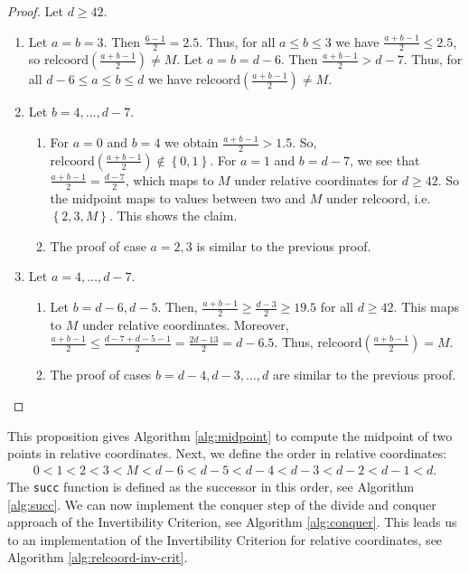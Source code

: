 \begin{proof}
    Let \( d \geq 42 \).
    \begin{enumerate}
        \item Let \( a = b = 3 \). Then \( \frac{6 - 1 }{2} = 2.5 \). Thus, for all \( a \leq b \leq 3 \) we have \( \frac{a + b - 1 }{2} \leq 2.5 \), so \(\mathrm{relcoord}( \frac{a + b - 1 }{2})  \neq M \). Let \( a = b = d - 6 \). Then \( \frac{a + b -1}{2} > d - 7 \). Thus, for all \( d-6 \leq a \leq b \leq d \) we have \( \mathrm{relcoord}(\frac{a + b - 1 }{2}) \neq M \).
        \item Let \( b = 4, \dots, d-7 \).
        \begin{enumerate}
            \item For \( a = 0 \) and \( b  = 4 \) we obtain \( \frac{a + b -1}{2} > 1.5 \). So, \( \mathrm{relcoord}(\frac{a + b - 1}{2})  \notin \left\{ 0,1 \right\} \). For \( a = 1 \) and \( b  = d-7 \), we see that \( \frac{a + b -1}{2} = \frac{d-7}{2} \), which maps to \( M \) under relative coordinates for \( d \geq 42 \). So the midpoint maps to values between two and \( M \) under \( \mathrm{relcoord} \), i.e. \( \left\{ 2,3,M \right\} \). This shows the claim.
            \item The proof of case \( a = 2,3 \) is similar to the previous proof.
        \end{enumerate}
        \item Let \( a = 4, \dots, d-7 \).
        \begin{enumerate}
            \item Let \( b = d-6, d-5 \). Then, \( \frac{a + b - 1}{2} \geq \frac{d - 3}{2} \geq 19.5 \) for all \( d \geq 42 \). This maps to \( M \) under relative coordinates. Moreover,  \( \frac{a + b - 1}{2} \leq \frac{d - 7 + d - 5 - 1}{2} = \frac{2d - 13}{2} = d - 6.5 \). Thus, 
            \( \mathrm{relcoord}(\frac{a + b - 1}{2}) = M \).
            \item The proof of cases \( b = d-4, d-3, \dots, d \) are similar to the previous proof.
        \end{enumerate}
    \end{enumerate}
\end{proof}

This proposition gives Algorithm \ref{alg:midpoint} to compute the midpoint of two points in relative coordinates. Next, we define the order in relative coordinates:
\begin{align*}
    0 < 1 < 2 < 3 < M < d-6 < d-5 < d-4 < d-3 < d-2 < d-1 < d.
\end{align*}
The \texttt{succ} function is defined as the successor in this order, see Algorithm \ref{alg:succ}. We can now implement the conquer step of the divide and conquer approach of the Invertibility Criterion, see Algorithm \ref{alg:conquer}. This leads us to an implementation of the Invertibility Criterion for relative coordinates, see Algorithm \ref{alg:relcoord-inv-crit}.


